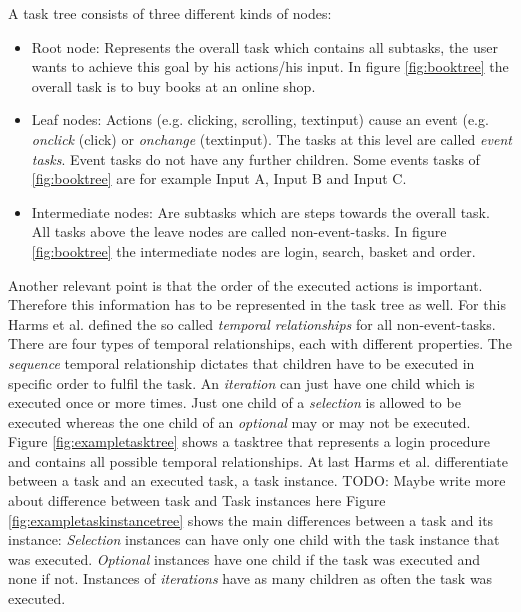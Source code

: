 A task tree consists of three different kinds of nodes:
\begin{itemize} 
	\item Root node: Represents the overall task which contains all subtasks, the user wants to achieve this goal by his actions/his input. In figure \ref{fig:booktree} the overall task is to buy books at an online shop.
	\item Leaf nodes: Actions (e.g. clicking, scrolling, textinput) cause an event (e.g. \textit{onclick} (click) or \textit{onchange} (textinput). The tasks at this level are called \textit{event tasks}. Event tasks do not have any further children. Some events tasks of \ref{fig:booktree} are for example Input A, Input B and Input C.
	\item Intermediate nodes: Are subtasks which are steps towards the overall task. All tasks above the leave nodes are called non-event-tasks. In figure \ref{fig:booktree} the intermediate nodes are login, search, basket and order.
\end{itemize}
Another relevant point is that the order of the executed actions is important. 
Therefore this information has to be represented in the task tree as well. 
For this Harms et al. defined the so called \textit{temporal relationships} for all non-event-tasks. 
There are four types of temporal relationships, each with different properties. 
The \textit{sequence} temporal relationship dictates that children have to be executed in specific order to fulfil the task. 
An \textit{iteration} can just have one child which is executed once or more times. 
Just one child of a \textit{selection} is allowed to be executed whereas the one child of an \textit{optional} may or may not be executed. 
Figure \ref{fig:exampletasktree} shows a tasktree that represents a login procedure and contains all possible temporal relationships. 
At last Harms et al. differentiate between a task and an executed task, a task instance. TODO: Maybe write more about difference between task and Task instances here
Figure \ref{fig:exampletaskinstancetree} shows the main differences between a task and its instance: \textit{Selection} instances can have only one child with the task instance that was executed. \textit{Optional} instances have one child if the task was executed and none if not. Instances of \textit{iterations} have as many children as often the task was executed.
